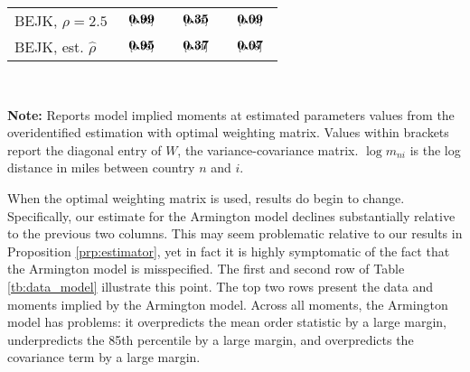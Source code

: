 \documentclass[12pt,dvips, ps2pdf]{article}
\begin{document}
\begin{table}[!h]
\begin{center}
\begin{tabular}[t]{l  c c c}
BEJK, $\rho = 2.5$ &  $\begin{array}{c}{\textbf{0.99}} \vspace{-.4cm}\\ \scriptstyle{[0.09]}\end{array}$  & $\begin{array}{c}{\textbf{0.35}} \vspace{-.4cm}\\ \scriptstyle{[0.01]}\end{array}$  & $\begin{array}{c}{\textbf{0.09}} \vspace{-.4cm}\\ \scriptstyle{[0.09]}\end{array}$        \\
BEJK, est. $\hat{\rho}$  &  $\begin{array}{c}{\textbf{0.95}} \vspace{-.4cm}\\ \scriptstyle{[0.09]}\end{array}$  & $\begin{array}{c}{\textbf{0.37}} \vspace{-.4cm}\\ \scriptstyle{[0.01]}\end{array}$  & $\begin{array}{c}{\textbf{0.07}} \vspace{-.4cm}\\ \scriptstyle{[0.08]}\end{array}$        \\
\hline
\end{tabular}
\\[0.75ex]
\parbox{4.8in}{\footnotesize \textbf{Note:} Reports model implied moments at estimated parameters values from the overidentified estimation with optimal weighting matrix. Values within brackets report the diagonal entry of $W$, the variance-covariance matrix. $\log m_{ni}$ is the log distance in miles between country $n$ and $i$.}
\end{center}
\end{table}

When the optimal weighting matrix is used, results do begin to change. Specifically, our estimate for the Armington model declines substantially relative to the previous two columns. This may seem problematic relative to our results in Proposition \ref{prp:estimator}, yet in fact it is highly symptomatic of the fact that the Armington model is misspecified. The first and second row of Table \ref{tb:data_model} illustrate this point. The top two rows present the data and moments implied by the Armington model. Across all moments, the Armington model has problems: it overpredicts the mean order statistic by a large margin, underpredicts the 85th percentile by a large margin, and overpredicts the covariance term by a large margin.
\end{document}
